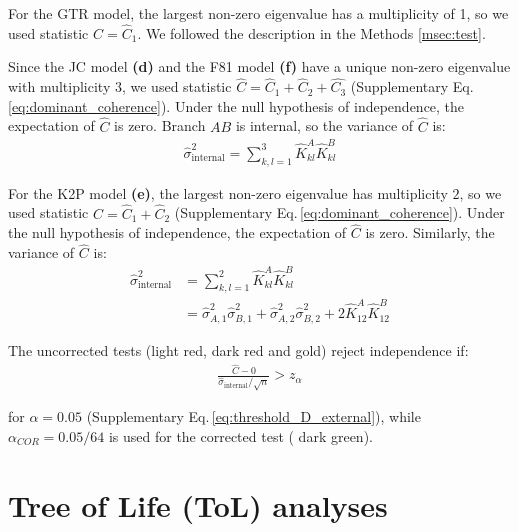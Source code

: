 \begin{appendices}
\medskip

For the GTR model, the largest non-zero eigenvalue has a multiplicity of
1, so we used statistic $\hat C = \hat{C}_1$. We followed the description in the Methods \ref{msec:test}.

Since the JC model \textbf{(d)} and the F81 model \textbf{(f)} have a unique non-zero eigenvalue with multiplicity $3$, we used statistic $\hat{C} = \hat{C}_1+\hat{C}_2+\hat{C_3}$ (Supplementary Eq.\,\eqref{eq:dominant_coherence}).  Under the null hypothesis of independence, the expectation of $\hat{C}$ is zero. Branch $AB$ is internal, so the variance of $\hat C$ is:
\begin{align*}
  \hat{\sigma}^2_{\text{internal}} =  \sum_{k, l=1}^3
   \hat{K}^A_{kl}   \hat{K}^B_{kl}
\end{align*}

 For the K2P model \textbf{(e)}, the largest non-zero eigenvalue  has multiplicity $2$, so we used statistic $\hat{C} = \hat{C}_1+\hat{C}_2$ (Supplementary Eq.\,\eqref{eq:dominant_coherence}). Under the null hypothesis of independence, the expectation of $\hat{C}$ is zero. Similarly, the variance of $\hat C$ is:
\begin{align*}
  \hat{\sigma}^2_{\text{internal}} &= \sum_{k, l=1}^2
   \hat{K}^A_{kl}   \hat{K}^B_{kl}\\
   &=\hat{\sigma}^2_{A,1}\hat{\sigma}^2_{B,1}+\hat{\sigma}^2_{A,2}\hat{\sigma}^2_{B,2} + 2\hat{K}^A_{12}\hat{K}^B_{12}
\end{align*}

The uncorrected tests ({\color{truetree}light red}, {\color{truetreeML} dark red} and {\color{truetreeNoMisspecification}gold}) reject independence if:
\begin{align*}
 \frac{\hat{C}-0}{\hat{\sigma}_{\text{internal}}/\sqrt{n}} > z_\alpha 
\end{align*}

for $\alpha=0.05$ (Supplementary Eq.\,\eqref{eq:threshold_D_external}), while $\alpha_{COR}=0.05/64$  is used for the corrected test ({\color{MLtreeBonferroni} dark green}).

\bigskip


    \clearpage

    
\newpage
\section{Tree of Life (ToL) analyses}


\end{appendices}
